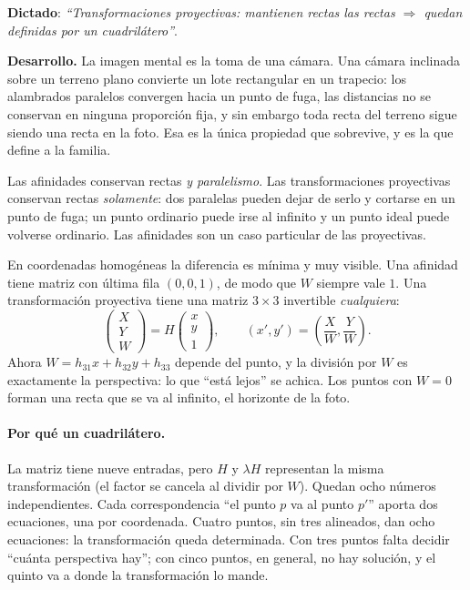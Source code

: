 {\small\vspace{1mm}\par}


\textbf{Dictado}: \emph{``Transformaciones proyectivas: mantienen rectas las rectas
\(\Rightarrow\) quedan definidas por un cuadrilátero''}.

\textbf{Desarrollo.} La imagen mental es la toma de una cámara. Una cámara inclinada sobre un
terreno plano convierte un lote rectangular en un trapecio: los alambrados paralelos
convergen hacia un punto de fuga, las distancias no se conservan en ninguna proporción fija,
y sin embargo toda recta del terreno sigue siendo una recta en la foto. Esa es la única
propiedad que sobrevive, y es la que define a la familia.

\begin{idea}
Las afinidades conservan rectas \emph{y paralelismo}. Las transformaciones proyectivas
conservan rectas \emph{solamente}: dos paralelas pueden dejar de serlo y cortarse en un punto
de fuga; un punto ordinario puede irse al infinito y un punto ideal puede volverse ordinario.
Las afinidades son un caso particular de las proyectivas.
\end{idea}

En coordenadas homogéneas la diferencia es mínima y muy visible. Una afinidad tiene matriz
con última fila \((0,0,1)\), de modo que \(W\) siempre vale \(1\). Una transformación
proyectiva tiene una matriz \(3\times3\) invertible \emph{cualquiera}:
\[
\begin{pmatrix}X\\Y\\W\end{pmatrix}=H\begin{pmatrix}x\\y\\1\end{pmatrix},
\qquad
(x',y')=\left(\frac{X}{W},\frac{Y}{W}\right).
\]
Ahora \(W=h_{31}x+h_{32}y+h_{33}\) depende del punto, y la división por \(W\) es
exactamente la perspectiva: lo que ``está lejos'' se achica. Los puntos con \(W=0\) forman
una recta que se va al infinito, el horizonte de la foto.

\paragraph{Por qué un cuadrilátero.}
La matriz tiene nueve entradas, pero \(H\) y \(\lambda H\) representan la misma
transformación (el factor se cancela al dividir por \(W\)). Quedan ocho números
independientes. Cada correspondencia ``el punto \(p\) va al punto \(p'\)'' aporta dos
ecuaciones, una por coordenada. Cuatro puntos, sin tres alineados, dan ocho ecuaciones: la
transformación queda determinada. Con tres puntos falta decidir ``cuánta perspectiva hay'';
con cinco puntos, en general, no hay solución, y el quinto va a donde la transformación lo
mande.

